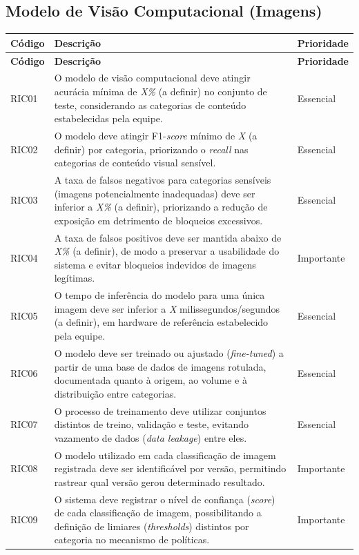 \documentclass[
    12pt,           %
    oneside,        %
    a4paper,        %
    chapter=TITLE,  %
    english,        %
    brazil          %
]{abntex2}
\begin{document}
\subsection{Modelo de Visão Computacional (Imagens)}

\begin{longtable}{|p{1.7cm}|p{9.8cm}|p{2.1cm}|}
\hline
\textbf{Código} & \textbf{Descrição} & \textbf{Prioridade} \\ \hline
\endfirsthead
\hline
\textbf{Código} & \textbf{Descrição} & \textbf{Prioridade} \\ \hline
\endhead

RIC01 & O modelo de visão computacional deve atingir acurácia mínima de \textit{X\%} (a definir) no conjunto de teste, considerando as categorias de conteúdo estabelecidas pela equipe. & Essencial \\ \hline
RIC02 & O modelo deve atingir F1-\textit{score} mínimo de \textit{X} (a definir) por categoria, priorizando o \textit{recall} nas categorias de conteúdo visual sensível. & Essencial \\ \hline
RIC03 & A taxa de falsos negativos para categorias sensíveis (imagens potencialmente inadequadas) deve ser inferior a \textit{X\%} (a definir), priorizando a redução de exposição em detrimento de bloqueios excessivos. & Essencial \\ \hline
RIC04 & A taxa de falsos positivos deve ser mantida abaixo de \textit{X\%} (a definir), de modo a preservar a usabilidade do sistema e evitar bloqueios indevidos de imagens legítimas. & Importante \\ \hline
RIC05 & O tempo de inferência do modelo para uma única imagem deve ser inferior a \textit{X} milissegundos/segundos (a definir), em hardware de referência estabelecido pela equipe. & Essencial \\ \hline
RIC06 & O modelo deve ser treinado ou ajustado (\textit{fine-tuned}) a partir de uma base de dados de imagens rotulada, documentada quanto à origem, ao volume e à distribuição entre categorias. & Essencial \\ \hline
RIC07 & O processo de treinamento deve utilizar conjuntos distintos de treino, validação e teste, evitando vazamento de dados (\textit{data leakage}) entre eles. & Essencial \\ \hline
RIC08 & O modelo utilizado em cada classificação de imagem registrada deve ser identificável por versão, permitindo rastrear qual versão gerou determinado resultado. & Importante \\ \hline
RIC09 & O sistema deve registrar o nível de confiança (\textit{score}) de cada classificação de imagem, possibilitando a definição de limiares (\textit{thresholds}) distintos por categoria no mecanismo de políticas. & Importante \\ \hline

\end{longtable}
\end{document}
